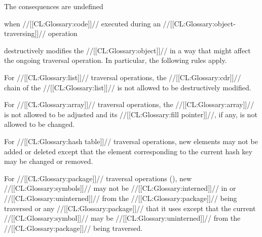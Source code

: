 


 
The consequences are undefined 

when //[[CL:Glossary:code]]// executed during an //[[CL:Glossary:object-traversing]]// operation

destructively modifies the //[[CL:Glossary:object]]// in a way that might affect the
ongoing traversal operation.
In particular, the following rules apply.
\beginlist
{}
 
 For //[[CL:Glossary:list]]// traversal operations, the //[[CL:Glossary:cdr]]// chain of the
 //[[CL:Glossary:list]]// is not allowed to be destructively modified.
 

  For //[[CL:Glossary:array]]// traversal operations, the //[[CL:Glossary:array]]// is not allowed 
  to be adjusted and its //[[CL:Glossary:fill pointer]]//, if any, is not allowed to 
  be changed.
 

  For //[[CL:Glossary:hash table]]// traversal operations, new elements may not be added
  or deleted except that the element corresponding to the current hash key 
  may be changed or removed.
 





  For //[[CL:Glossary:package]]// traversal operations (\eg {}),
  new //[[CL:Glossary:symbols]]// may not be //[[CL:Glossary:interned]]// in or //[[CL:Glossary:uninterned]]// 
  from the //[[CL:Glossary:package]]// being traversed 
  or any //[[CL:Glossary:package]]// that it uses except that the 
  current //[[CL:Glossary:symbol]]// may be //[[CL:Glossary:uninterned]]// from the //[[CL:Glossary:package]]// 
  being traversed.

\endlist 





